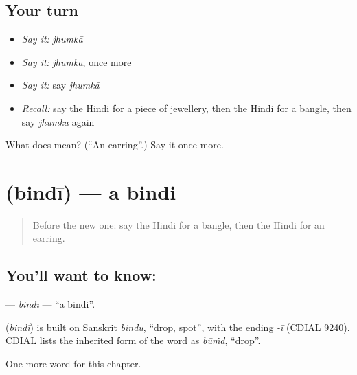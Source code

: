 \subsection*{Your turn}
\begin{itemize}
\raggedright
  \item \emph{Say it:} \emph{jhumkā}
  \item \emph{Say it:} \emph{jhumkā}, once more
  \item \emph{Say it:} say \emph{jhumkā}
  \item \emph{Recall:} say the Hindi for a piece of jewellery, then the Hindi for a bangle, then say \emph{jhumkā} again
\end{itemize}

\begin{tcolorbox}[breakable,colback=teal!4,colframe=teal!35!black,title={Before you move on}]
What does  mean? (\textquotedblleft{}An earring\textquotedblright{}.) Say it once more.
\end{tcolorbox}
\section[\texorpdfstring{\hi{बिंदी} (bindī)}{बिंदी (bindī)}]{ (bindī) — a bindi}

\label{lesson:HI-C263-bindi}



\begin{quote}
Before the new one: say the Hindi for a bangle, then the Hindi for an earring.
\end{quote}

\subsection*{You'll want to know: }
\textbf{} — \emph{bindī} — \textquotedblleft{}a bindi\textquotedblright{}.

\begin{cousinweb}
\textbf{} (\emph{bindī}) is built on Sanskrit \emph{bindu}, \textquotedblleft{}drop, spot\textquotedblright{}, with the ending \emph{-ī} (CDIAL 9240). CDIAL lists the inherited form of the word as \emph{būṁd}, \textquotedblleft{}drop\textquotedblright{}.
\end{cousinweb}

\begin{grammarlens}[title={What you've built}]
One more word for this chapter.
\end{grammarlens}

